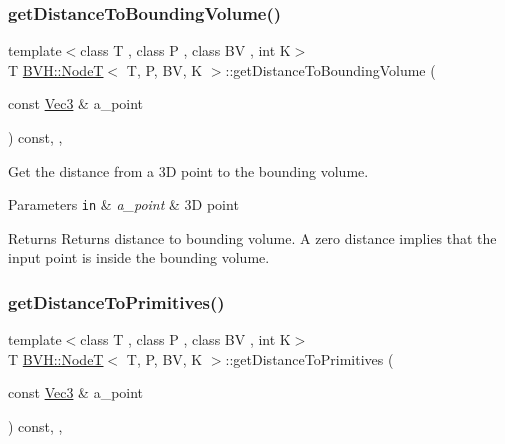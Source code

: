 \subsubsection{\texorpdfstring{get\+Distance\+To\+Bounding\+Volume()}{getDistanceToBoundingVolume()}}
{\footnotesize\ttfamily template$<$class T , class P , class BV , int K$>$ \\
T \hyperlink{classBVH_1_1NodeT}{B\+V\+H\+::\+NodeT}$<$ T, P, BV, K $>$\+::get\+Distance\+To\+Bounding\+Volume (\begin{DoxyParamCaption}\item[{const \hyperlink{classBVH_1_1NodeT_a6fbb4308c5c55ee170c5f992df7ae1d0}{Vec3} \&}]{a\+\_\+point }\end{DoxyParamCaption}) const\hspace{0.3cm}{\ttfamily [inline]}, {\ttfamily [protected]}, {\ttfamily [noexcept]}}



Get the distance from a 3D point to the bounding volume. 


\begin{DoxyParams}[1]{Parameters}
\mbox{\tt in}  & {\em a\+\_\+point} & 3D point \\
\hline
\end{DoxyParams}
\begin{DoxyReturn}{Returns}
Returns distance to bounding volume. A zero distance implies that the input point is inside the bounding volume. 
\end{DoxyReturn}
\mbox{\label{classBVH_1_1NodeT_a61dc7040d57f0a69984548eb4804244b}} 
\subsubsection{\texorpdfstring{get\+Distance\+To\+Primitives()}{getDistanceToPrimitives()}}
{\footnotesize\ttfamily template$<$class T , class P , class BV , int K$>$ \\
T \hyperlink{classBVH_1_1NodeT}{B\+V\+H\+::\+NodeT}$<$ T, P, BV, K $>$\+::get\+Distance\+To\+Primitives (\begin{DoxyParamCaption}\item[{const \hyperlink{classBVH_1_1NodeT_a6fbb4308c5c55ee170c5f992df7ae1d0}{Vec3} \&}]{a\+\_\+point }\end{DoxyParamCaption}) const\hspace{0.3cm}{\ttfamily [inline]}, {\ttfamily [protected]}, {\ttfamily [noexcept]}}



